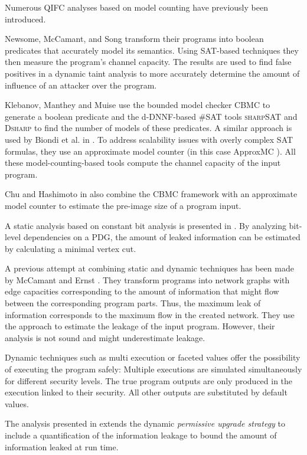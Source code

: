 Numerous QIFC analyses based on model counting have previously been introduced.

Newsome, McCamant, and Song \cite{newsome09} transform their programs into boolean predicates that accurately model its semantics. Using SAT-based techniques they then measure the program's channel capacity. The results are used to find false positives in a dynamic taint analysis to more accurately determine the amount of influence of an attacker over the program. 

Klebanov, Manthey and Muise \cite{klebanov13} use the bounded model checker CBMC \cite{cbmc} to generate a boolean predicate and the d-DNNF-based \#SAT tools \textsc{sharp}SAT \cite{thurley06} and \textsc{Dsharp} \cite{muise12} to find the number of models of these predicates. A similar approach is used by Biondi et al. in \cite{biondi18}. To address scalability issues with overly complex SAT formulas, they use an approximate model counter (in this case ApproxMC \cite{chakraborty13}). All these model-counting-based tools compute the channel capacity of the input program.

Chu and Hashimoto in \cite{chu19} also combine the CBMC framework with an approximate model counter to estimate the pre-image size of a program input.

A static analysis based on constant bit analysis is presented in \cite{bechberger18}. By analyzing bit-level dependencies on a PDG, the amount of leaked information can be estimated by calculating a minimal vertex cut.

A previous attempt at combining static and dynamic techniques has been made by McCamant and Ernst \cite{mccamant08}. They transform programs into network graphs with edge capacities corresponding to the amount of information that might flow between the corresponding program parts. Thus, the maximum leak of information corresponds to the maximum flow in the created network. They use the approach to estimate the leakage of the input program. However, their analysis is not sound and might underestimate leakage.

Dynamic techniques such as multi execution \cite{devriese10} or faceted values \cite{austin17} offer the possibility of executing the program safely: Multiple executions are simulated simultaneously for different security levels. The true program outputs are only produced in the execution linked to their security. All other outputs are substituted by default values.

The analysis presented in \cite{bichhawat17} extends the dynamic \emph{permissive upgrade strategy} to include a quantification of the information leakage to bound the amount of information leaked at run time.

